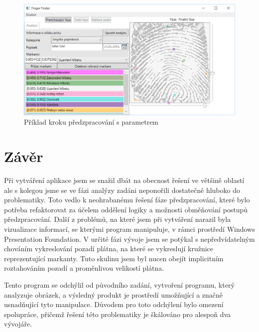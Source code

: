 \documentclass[12pt,a4paper]{article}
\let\oldsection\section
\renewcommand\section{\clearpage\oldsection}
\begin{document}
\begin{figure}[h]
  \centering
\includegraphics[width=120mm]{img/um_04_analyse.png}
  \caption{Příklad kroku předzpracování s parametrem}
\end{figure}
\section{Závěr}
Při vytváření aplikace jsem se snažil dbát na obecnost řešení ve většině oblastí ale s kolegou jsme se ve fázi analýzy zadáni neponořili dostatečně hluboko do problematiky. Toto vedlo k neohrabanému řešení fáze předzpracování, které bylo potřeba refaktorovat za účelem oddělení logiky a možnosti obměňování postupů předzpracování.
Další z problémů, na které jsem při vytváření narazil byla vizualizace informací, se kterými program manipuluje, v rámci prostředí Windows Presentation Foundation. V určité fázi vývoje jsem se potýkal s nepředvídatelným chováním vykreslování pozadí plátna, na které se vykreslují kružnice reprezentující markanty. Tuto skulinu jsem byl nucen obejít implicitním roztahováním pozadí a proměnlivou velikostí plátna.

Tento program se odchýlil od původního zadání, vytvoření programu, který analyzuje obrázek, a výsledný produkt je prostředí umožňující a značně usnadňující tyto manipulace. Důvodem pro toto odchýlení bylo omezení spolupráce, přičemž řešení této problematiky je škálováno pro alespoň dva vývojáře.
\end{document}
